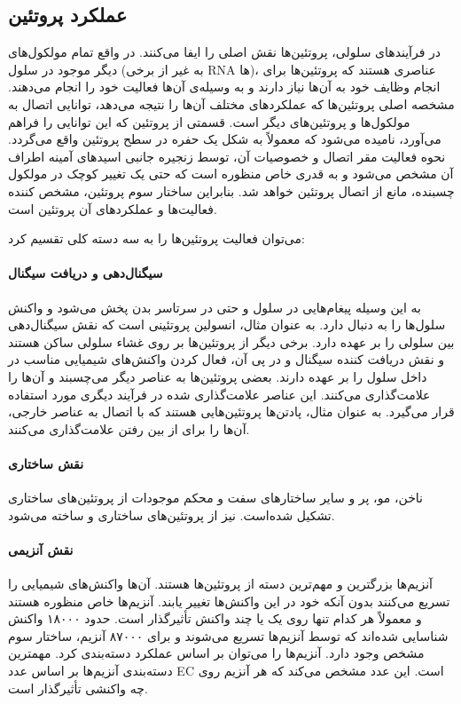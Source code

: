 \subsection{عملکرد پروتئین}
در فرآیندهای سلولی، پروتئین‌ها نقش اصلی را ایفا می‌کنند. در واقع تمام مولکول‌های دیگر موجود در سلول (به غیر از برخی RNA ها)، عناصری هستند که پروتئین‌ها برای انجام وظایف خود به ‌آن‌ها نیاز دارند و به وسیله‌ی آن‌ها فعالیت خود را انجام می‌دهند. مشخصه اصلی پروتئین‌ها که عملکرد‌های مختلف آن‌ها را نتیجه می‌دهد، توانایی اتصال به مولکول‌ها و پروتئین‌های دیگر است. قسمتی از پروتئین که این توانایی را فراهم می‌آورد،  نامیده می‌شود که معمولاً به شکل یک حفره در سطح پروتئین واقع می‌گردد. نحوه فعالیت مقر اتصال و خصوصیات آن، توسط زنجیره جانبی اسید‌های آمینه اطراف آن مشخص می‌شود و به قدری خاص منظوره است که حتی یک تغییر کوچک در مولکول چسبنده، مانع از اتصال پروتئین خواهد شد. بنابراین ساختار سوم پروتئین، مشخص کننده فعالیت‌ها و عملکرد‌های آن پروتئین است.

می‌توان فعالیت پروتئین‌ها را به سه دسته کلی تقسیم کرد:

\paragraph{سیگنال‌دهی و دریافت سیگنال}
به این وسیله پیغام‌هایی در سلول و حتی در سرتاسر بدن پخش می‌شود و واکنش سلول‌ها را به دنبال دارد. به عنوان مثال، انسولین پروتئینی است که نقش سیگنال‌دهی بین سلولی را بر عهده دارد. برخی دیگر از پروتئین‌ها بر روی غشاء سلولی ساکن هستند و نقش دریافت کننده سیگنال و در پی آن، فعال کردن واکنش‌های شیمیایی مناسب در داخل سلول را بر عهده دارند. بعضی پروتئین‌ها به عناصر دیگر می‌چسبند و آن‌ها را علامت‌گذاری می‌کنند. این عناصر علامت‌گذاری شده در فرآیند دیگری مورد استفاده قرار می‌گیرد. به عنوان مثال، پادتن‌ها پروتئین‌هایی هستند که با اتصال به عناصر خارجی، آن‌ها را برای از بین رفتن علامت‌گذاری می‌کنند.

\paragraph{نقش ساختاری}
ناخن، مو، پر و سایر ساختارهای سفت و محکم موجودات از پروتئین‌های ساختاری تشکیل شده‌است.  نیز از پروتئین‌های ساختاری  و  ساخته می‌شود.

\paragraph{نقش آنزیمی} 
آنزیم‌ها بزرگترین و مهم‌ترین دسته از پروتئین‌ها هستند. آن‌ها واکنش‌های شیمیایی را تسریع می‌کنند بدون آنکه خود در این واکنش‌ها تغییر یابند. آنزیم‌ها خاص منظوره هستند و معمولاً  هر کدام تنها روی یک یا چند واکنش تأثیرگذار است. حدود ۱۸۰۰۰ واکنش شناسایی شده‌اند که توسط آنزیم‌ها تسریع می‌شوند و برای ۸۷۰۰۰ آنزیم، ساختار سوم مشخص وجود دارد. آنزیم‌ها را می‌توان بر اساس عملکرد دسته‌بندی کرد. مهمترین دسته‌بندی آنزیم‌ها بر اساس عدد EC است. این عدد مشخص می‌کند که هر آنزیم روی چه واکنشی تأثیرگذار است.


